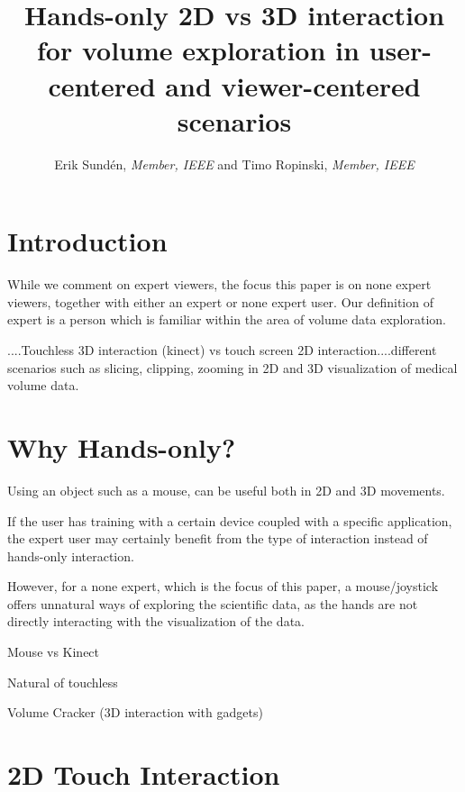 \documentclass[review,journal]{vgtc}         %
\title{Hands-only 2D vs 3D interaction for volume exploration in user-centered and viewer-centered scenarios}
\author{Erik Sund\'en, \textit{Member, IEEE} and Timo Ropinski, \textit{Member, IEEE}}
\begin{document}

\maketitle

\section{Introduction}\label{sec:introduction}

While we comment on expert viewers, the focus this paper is on none expert viewers, together with either an expert or none expert user. Our definition of expert is a person which is familiar within the area of volume data exploration.

....Touchless 3D interaction (kinect) vs touch screen 2D interaction....different scenarios such as slicing, clipping, zooming in 2D and 3D visualization of medical volume data.

\section{Why Hands-only?}

Using an object such as a mouse, can be useful both in 2D and 3D movements.

If the user has training with a certain device coupled with a specific application, the expert user may certainly benefit from the type of interaction instead of hands-only interaction.

However, for a none expert, which is the focus of this paper, a mouse/joystick offers unnatural ways of exploring the scientific data, as the hands are not directly interacting with the visualization of the data.

Mouse vs Kinect \cite{doi:10.1117/12.2006994}

Natural of touchless \cite{O'hara:2013:NTP:2442106.2442111}

Volume Cracker (3D interaction with gadgets) \cite{Laha:2013:VCB:2491367.2491368}

\section{2D Touch Interaction}
\end{document}
